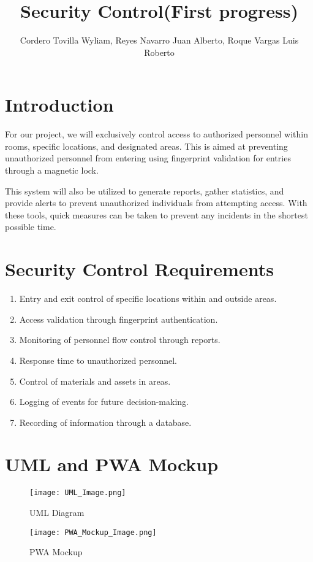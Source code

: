 \documentclass{IEEEtran}
\begin{document}
	
	\title{Security Control(First progress)}
	\author{Cordero Tovilla Wyliam, Reyes Navarro Juan Alberto, Roque Vargas Luis Roberto}
	\maketitle
	
	\section*{Introduction}

	For our project, we will exclusively control access to authorized personnel within rooms, specific locations, and designated areas. This is aimed at preventing unauthorized personnel from entering using fingerprint validation for entries through a magnetic lock.

	This system will also be utilized to generate reports, gather statistics, and provide alerts to prevent unauthorized individuals from attempting access. With these tools, quick measures can be taken to prevent any incidents in the shortest possible time.
	
	\section*{Security Control Requirements}
	
	\begin{enumerate}
		\item Entry and exit control of specific locations within and outside areas.
		\item Access validation through fingerprint authentication.
		\item Monitoring of personnel flow control through reports.
		\item Response time to unauthorized personnel.
		\item Control of materials and assets in areas.
		\item Logging of events for future decision-making.
		\item Recording of information through a database.
	\end{enumerate}
	
	\section*{UML and PWA Mockup}
	
	\begin{figure}[h]
		\centering
		\texttt{[image: UML\_Image.png]}
		\caption{UML Diagram}
		\label{fig:uml}
	\end{figure}
	
	\begin{figure}[h]
		\centering
		\texttt{[image: PWA\_Mockup\_Image.png]}
		\caption{PWA Mockup}
		\label{fig:pwa_mockup}
	\end{figure}
	
\end{document}
